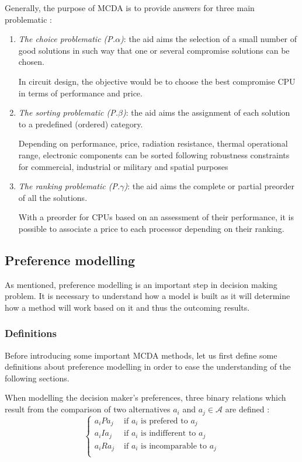 Generally, the purpose of MCDA is to provide answers for three main problematic \cite{EhrgottFigueiraGreco2005}:
\begin{enumerate}
\item \textit{The choice problematic (P.$\alpha$)}: the aid aims the selection of a small number of good solutions in such way that one or several compromise solutions can be chosen.
\begin{example}
In circuit design, the objective would be to choose the best compromise CPU in terms of performance and price.
\end{example}
\item \textit{The sorting problematic (P.$\beta$)}: the aid aims the assignment of each solution to a predefined (ordered) category.
\begin{example}
Depending on performance, price, radiation resistance, thermal operational range, electronic components can be sorted following robustness constraints for commercial, industrial or military and spatial purposes
\end{example}
\item \textit{The ranking problematic (P.$\gamma$)}: the aid aims the complete or partial preorder of all the solutions.
\begin{example}
With a preorder for CPUs based on an assessment of their performance, it is possible to associate a price to each processor depending on their ranking.
\end{example}
\end{enumerate}

\subsection{Preference modelling}
\label{sec:prefmod}
As mentioned, preference modelling is an important step in decision making problem. It is necessary to understand how a model is built as it will determine how a method will work based on it and thus the outcoming results.

\subsubsection{Definitions}
Before introducing some important MCDA methods, let us first define some definitions about preference modelling in order to ease the understanding of the following sections.

When modelling the decision maker's preferences, three binary relations which result from the comparison of two alternatives $a_i$ and $a_j \in \mathcal{A}$ are defined \cite{Vin92}:
\begin{equation}
\left\{
\begin{array}{ll}
a_iPa_j & \text{ if $a_i$ is prefered to $a_j$}\\
a_iIa_j & \text{ if $a_i$ is indifferent to $a_j$}\\
a_iRa_j & \text{ if $a_i$ is incomparable to $a_j$}\\
\end{array}
\right.
\end{equation}

